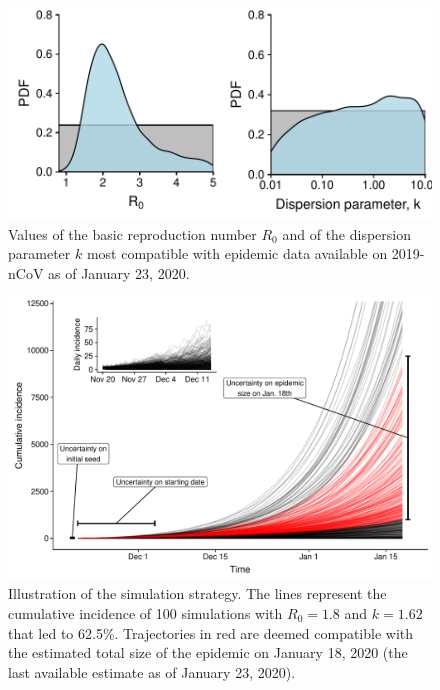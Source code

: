 \documentclass{article}
\begin{document}
\begin{figure}[h]
	\centering
	\includegraphics[width=.6\linewidth]{../figure/fig2.pdf}
	\caption{Values of the basic reproduction number $R_0$ and of the dispersion parameter $k$ most compatible with epidemic data available on 2019-nCoV as of January 23, 2020.}
	\label{fig:fig2}
\end{figure}


\begin{figure}[h]
	\centering
	\includegraphics[width=.9\linewidth]{../figure/fig3b.pdf}
	\caption{Illustration of the simulation strategy. The lines represent the cumulative incidence of 100 simulations with $R_0=1.8$ and $k=1.62$ that led to 62.5\%. Trajectories in red are deemed compatible with the estimated total size of the epidemic on January 18, 2020 (the last available estimate as of January 23, 2020).}
	\label{fig:fig3}
\end{figure}
\end{document}
